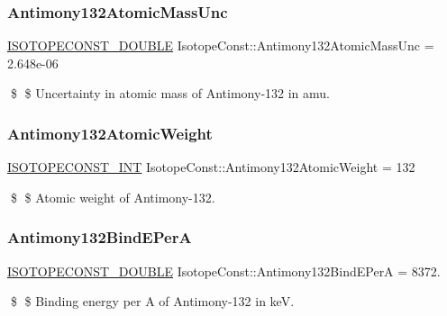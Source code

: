 \subsubsection{\texorpdfstring{Antimony132\+Atomic\+Mass\+Unc}{Antimony132AtomicMassUnc}}
{\footnotesize\ttfamily \mbox{\hyperlink{group___isotope_const-_macros_ga8f45a7272ce02c0b4c65c44636ed719a}{I\+S\+O\+T\+O\+P\+E\+C\+O\+N\+S\+T\+\_\+\+D\+O\+U\+B\+LE}} Isotope\+Const\+::\+Antimony132\+Atomic\+Mass\+Unc = 2.\+648e-\/06}

\$ \$ Uncertainty in atomic mass of Antimony-\/132 in amu. \mbox{\label{group___isotope_const-_antimony-_sb132_gaeca2b6f757d7211d912256bd8ae5aafa}} 
\subsubsection{\texorpdfstring{Antimony132\+Atomic\+Weight}{Antimony132AtomicWeight}}
{\footnotesize\ttfamily \mbox{\hyperlink{group___isotope_const-_macros_ga5f18360b3e99483a35c32d789e62621c}{I\+S\+O\+T\+O\+P\+E\+C\+O\+N\+S\+T\+\_\+\+I\+NT}} Isotope\+Const\+::\+Antimony132\+Atomic\+Weight = 132}

\$ \$ Atomic weight of Antimony-\/132. \mbox{\label{group___isotope_const-_antimony-_sb132_ga9d5d8e8ade468432e4acde96394dae82}} 
\subsubsection{\texorpdfstring{Antimony132\+Bind\+E\+PerA}{Antimony132BindEPerA}}
{\footnotesize\ttfamily \mbox{\hyperlink{group___isotope_const-_macros_ga8f45a7272ce02c0b4c65c44636ed719a}{I\+S\+O\+T\+O\+P\+E\+C\+O\+N\+S\+T\+\_\+\+D\+O\+U\+B\+LE}} Isotope\+Const\+::\+Antimony132\+Bind\+E\+PerA = 8372.}

\$ \$ Binding energy per A of Antimony-\/132 in keV. \mbox{\label{group___isotope_const-_antimony-_sb132_ga9f239459f096d186c81183257644291a}} 
